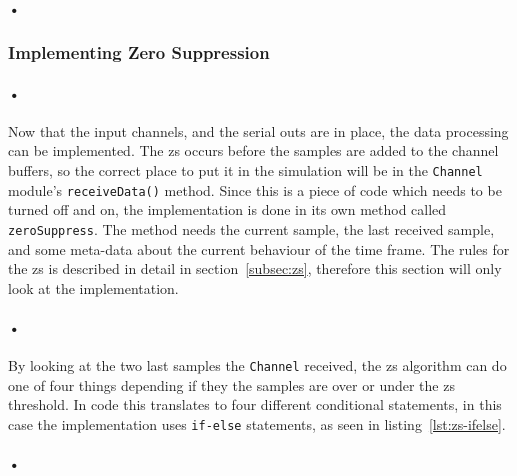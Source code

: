 \documentclass[a4paper, 12pt]{report}\dfrac{\right }{•}
\newcommand{\codeword}[1]{\texttt{#1}}
\begin{document}
\paragraph{•}
\begin{minipage}{\linewidth}

\end{minipage}

\subsubsection{Implementing Zero Suppression}

\paragraph{•} 
Now that the input channels, and the serial outs are in place, the data processing can be implemented.
The \gls{zs} occurs before the samples are added to the channel buffers, so the correct place to put it in the simulation will be in the \codeword{Channel} module's \codeword{receiveData()} method.
Since this is a piece of code which needs to be turned off and on, the implementation is done in its own method called \codeword{zeroSuppress}.
The method needs the current sample, the last received sample, and some meta-data about the current behaviour of the time frame.
The rules for the \gls{zs} is described in detail in section~\ref{subsec:zs}, therefore this section will only look at the implementation.

\paragraph{•}
By looking at the two last samples the \codeword{Channel} received, the \gls{zs} algorithm can do one of four things depending if they the samples are over or under the \gls{zs} threshold.
In code this translates to four different conditional statements, in this case the implementation uses \codeword{if-else} statements, as seen in listing~\ref{lst:zs-ifelse}.

\paragraph{•}
\begin{minipage}{\linewidth}

\end{minipage}
\end{document}

